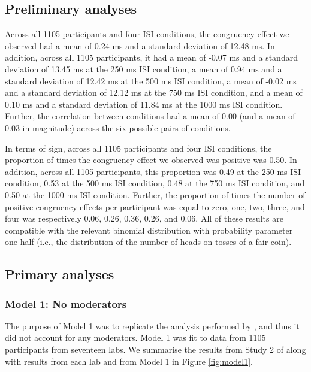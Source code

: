 \documentclass[A4paper,man,floatsintext]{apa6}
\theoremstyle{definition}
\theoremstyle{definition}
\theoremstyle{definition}
\theoremstyle{remark}
\begin{document}
\subsection{Preliminary analyses}\label{preliminary-analyses}

Across all 1105 participants and four ISI conditions, the congruency
effect we observed had a mean of 0.24 ms and a standard deviation of
12.48 ms. In addition, across all 1105 participants, it had a mean of
-0.07 ms and a standard deviation of 13.45 ms at the 250 ms ISI
condition, a mean of 0.94 ms and a standard deviation of 12.42 ms at the
500 ms ISI condition, a mean of -0.02 ms and a standard deviation of
12.12 ms at the 750 ms ISI condition, and a mean of 0.10 ms and a
standard deviation of 11.84 ms at the 1000 ms ISI condition. Further,
the correlation between conditions had a mean of 0.00 (and a mean of
0.03 in magnitude) across the six possible pairs of conditions.

In terms of sign, across all 1105 participants and four ISI conditions,
the proportion of times the congruency effect we observed was positive
was 0.50. In addition, across all 1105 participants, this proportion was
0.49 at the 250 ms ISI condition, 0.53 at the 500 ms ISI condition, 0.48
at the 750 ms ISI condition, and 0.50 at the 1000 ms ISI condition.
Further, the proportion of times the number of positive congruency
effects per participant was equal to zero, one, two, three, and four was
respectively 0.06, 0.26, 0.36, 0.26, and 0.06. All of these results are
compatible with the relevant binomial distribution with probability
parameter one-half (i.e., the distribution of the number of heads on
tosses of a fair coin).

\subsection{Primary analyses}\label{primary-analyses}

\subsubsection{Model 1: No moderators}\label{model-1-no-moderators-1}

The purpose of Model 1 was to replicate the analysis performed by
\textcite{Fischer:2003ju}, and thus it did not account for any
moderators. Model 1 was fit to data from 1105 participants from
seventeen labs. We summarise the results from Study 2 of
\textcite{Fischer:2003ju} along with results from each lab and from
Model 1 in Figure \ref{fig:model1}.
\end{document}
